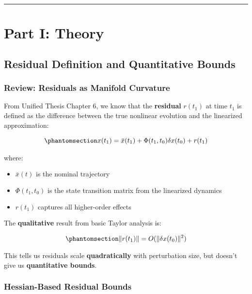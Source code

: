 \documentclass[
  letterpaper,
  DIV=11,
  numbers=noendperiod]{scrartcl}
\providecommand{\tightlist}{%
  \setlength{\itemsep}{0pt}\setlength{\parskip}{0pt}}\usepackage{longtable,booktabs,array}
\begin{document}
\begin{center}\rule{0.5\linewidth}{0.5pt}\end{center}

\section{Part I: Theory}\label{sec-theory}

\subsection{Residual Definition and Quantitative
Bounds}\label{sec-residuals}

\subsubsection{Review: Residuals as Manifold
Curvature}\label{review-residuals-as-manifold-curvature}

From Unified Thesis Chapter 6, we know that the \textbf{residual}
\(r(t_1)\) at time \(t_1\) is defined as the difference between the true
nonlinear evolution and the linearized approximation:

\begin{equation}\phantomsection\label{eq-residual-def}{
x(t_1) = \bar{x}(t_1) + \Phi(t_1, t_0) \delta x(t_0) + r(t_1)
}\end{equation}

where:

\begin{itemize}
\tightlist
\item
  \(\bar{x}(t)\) is the nominal trajectory
\item
  \(\Phi(t_1, t_0)\) is the state transition matrix from the linearized
  dynamics
\item
  \(r(t_1)\) captures all higher-order effects
\end{itemize}

The \textbf{qualitative} result from basic Taylor analysis is:

\begin{equation}\phantomsection\label{eq-residual-quadratic}{
\| r(t_1) \| = O(\|\delta x(t_0)\|^2)
}\end{equation}

This tells us residuals scale \textbf{quadratically} with perturbation
size, but doesn't give us \textbf{quantitative bounds}.

\subsubsection{Hessian-Based Residual
Bounds}\label{hessian-based-residual-bounds}
\end{document}

